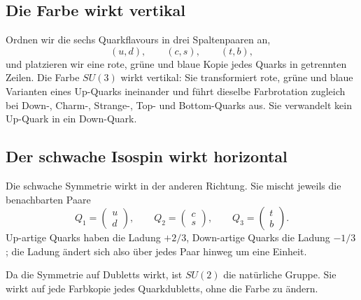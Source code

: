 \subsection{Die Farbe wirkt vertikal}

Ordnen wir die sechs Quarkflavours in drei Spaltenpaaren an,
\begin{equation}
(u,d),\qquad(c,s),\qquad(t,b),
\end{equation}
und platzieren wir eine rote, grüne und blaue Kopie jedes Quarks in getrennten Zeilen. Die Farbe \(SU(3)\) wirkt vertikal: Sie transformiert rote, grüne und blaue Varianten eines Up-Quarks ineinander und führt dieselbe Farbrotation zugleich bei Down-, Charm-, Strange-, Top- und Bottom-Quarks aus. Sie verwandelt kein Up-Quark in ein Down-Quark.

\subsection{Der schwache Isospin wirkt horizontal}

Die schwache Symmetrie wirkt in der anderen Richtung. Sie mischt jeweils die benachbarten Paare
\begin{equation}
Q_1=\begin{pmatrix}u\\d\end{pmatrix},
\qquad
Q_2=\begin{pmatrix}c\\s\end{pmatrix},
\qquad
Q_3=\begin{pmatrix}t\\b\end{pmatrix}.
\label{eq:l5-quark-doublets}
\end{equation}
Up-artige Quarks haben die Ladung \(+2/3\), Down-artige Quarks die Ladung \(-1/3\); die Ladung ändert sich also über jedes Paar hinweg um eine Einheit.

Da die Symmetrie auf Dubletts wirkt, ist \(SU(2)\) die natürliche Gruppe. Sie wirkt auf jede Farbkopie jedes Quarkdubletts, ohne die Farbe zu ändern.

